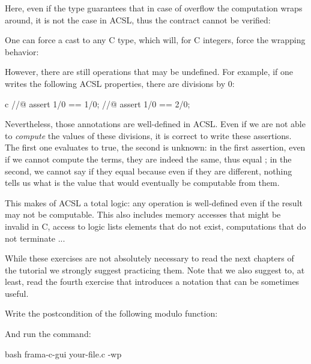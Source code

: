 

Here, even if the  type guarantees that in case of overflow
the computation wraps around, it is not the case in ACSL, thus the contract
cannot be verified:




One can force a cast to any C type, which will, for C integers, force the
wrapping behavior:




However, there are still operations that may be undefined. For example, if one
writes the following ACSL properties, there are divisions by 0:


\begin{CodeBlock}{c}
//@ assert 1/0 == 1/0;
//@ assert 1/0 == 2/0;
\end{CodeBlock}


Nevertheless, those annotations are well-defined in ACSL. Even if we are not
able to \textit{compute} the values of these divisions, it is correct to write
these assertions. The first one evaluates to true, the second is unknown: in the
first assertion, even if we cannot compute the terms, they are indeed the same,
thus equal ; in the second, we cannot say if they equal because even if they are
different, nothing tells us what is the value that would eventually be
computable from them.


This makes of ACSL a total logic: any operation is well-defined even if the
result may not be computable. This also includes memory accesses that might
be invalid in C, access to logic lists elements that do not exist, computations
that do not terminate ...





While these exercises are not absolutely necessary to read the next chapters
of the tutorial we strongly suggest practicing them. Note that we also
suggest to, at least, read the fourth exercise that introduces a notation
that can be sometimes useful.




Write the postcondition of the following modulo function:




And run the command:


\begin{CodeBlock}{bash}
frama-c-gui your-file.c -wp
\end{CodeBlock}


